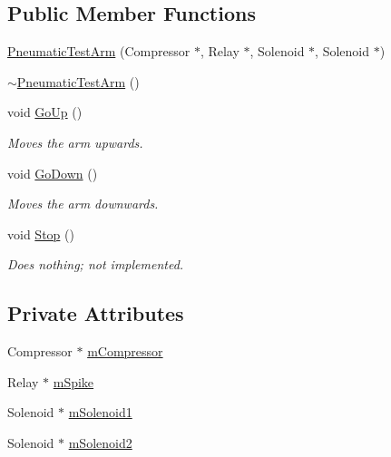 \subsection*{\-Public \-Member \-Functions}
\begin{DoxyCompactItemize}
\item 
\hyperlink{class_pneumatic_test_arm_abd75d55a51e9391ea726289505900342}{\-Pneumatic\-Test\-Arm} (\-Compressor $\ast$, \-Relay $\ast$, \-Solenoid $\ast$, \-Solenoid $\ast$)
\item 
\hyperlink{class_pneumatic_test_arm_a24b753fe06b1abe50f1e37b4e3ed55a2}{$\sim$\-Pneumatic\-Test\-Arm} ()
\item 
void \hyperlink{class_pneumatic_test_arm_a1cb8a42b057208030f5620b97481d057}{\-Go\-Up} ()
\begin{DoxyCompactList}\small\item\em \-Moves the arm upwards. \end{DoxyCompactList}\item 
void \hyperlink{class_pneumatic_test_arm_aca3125fe14d69b469a06adc5770c27bb}{\-Go\-Down} ()
\begin{DoxyCompactList}\small\item\em \-Moves the arm downwards. \end{DoxyCompactList}\item 
void \hyperlink{class_pneumatic_test_arm_a3bde87975fa58c58c86a6339751bc661}{\-Stop} ()
\begin{DoxyCompactList}\small\item\em \-Does nothing; not implemented. \end{DoxyCompactList}\end{DoxyCompactItemize}
\subsection*{\-Private \-Attributes}
\begin{DoxyCompactItemize}
\item 
\-Compressor $\ast$ \hyperlink{class_pneumatic_test_arm_a8a175af4d48bf840a49b37e9ef0da697}{m\-Compressor}
\item 
\-Relay $\ast$ \hyperlink{class_pneumatic_test_arm_aa7ac2676bd9c7a596698813c6be32250}{m\-Spike}
\item 
\-Solenoid $\ast$ \hyperlink{class_pneumatic_test_arm_a16bb555ce804d5a0b1d587472e5fb523}{m\-Solenoid1}
\item 
\-Solenoid $\ast$ \hyperlink{class_pneumatic_test_arm_a7d627d50dc4f17a7e76bd253b69ff1cc}{m\-Solenoid2}
\end{DoxyCompactItemize}


